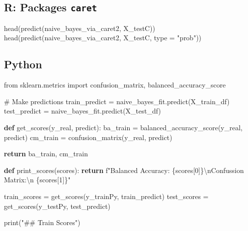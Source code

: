 \documentclass[
  letterpaper,
  DIV=11,
  numbers=noendperiod]{scrartcl}
\newenvironment{Shaded}{\begin{snugshade}}{\end{snugshade}}
\newcommand{\AttributeTok}[1]{\textcolor[rgb]{0.40,0.45,0.13}{#1}}
\newcommand{\BuiltInTok}[1]{\textcolor[rgb]{0.00,0.23,0.31}{#1}}
\newcommand{\CharTok}[1]{\textcolor[rgb]{0.13,0.47,0.30}{#1}}
\newcommand{\CommentTok}[1]{\textcolor[rgb]{0.37,0.37,0.37}{#1}}
\newcommand{\ControlFlowTok}[1]{\textcolor[rgb]{0.00,0.23,0.31}{\textbf{#1}}}
\newcommand{\DecValTok}[1]{\textcolor[rgb]{0.68,0.00,0.00}{#1}}
\newcommand{\FunctionTok}[1]{\textcolor[rgb]{0.28,0.35,0.67}{#1}}
\newcommand{\ImportTok}[1]{\textcolor[rgb]{0.00,0.46,0.62}{#1}}
\newcommand{\KeywordTok}[1]{\textcolor[rgb]{0.00,0.23,0.31}{\textbf{#1}}}
\newcommand{\NormalTok}[1]{\textcolor[rgb]{0.00,0.23,0.31}{#1}}
\newcommand{\OperatorTok}[1]{\textcolor[rgb]{0.37,0.37,0.37}{#1}}
\newcommand{\SpecialCharTok}[1]{\textcolor[rgb]{0.37,0.37,0.37}{#1}}
\newcommand{\SpecialStringTok}[1]{\textcolor[rgb]{0.13,0.47,0.30}{#1}}
\newcommand{\StringTok}[1]{\textcolor[rgb]{0.13,0.47,0.30}{#1}}
\begin{document}
\subsection{\texorpdfstring{R: Packages
\texttt{caret}}{R: Packages caret}}

\begin{Shaded}
\begin{Highlighting}[]
\FunctionTok{head}\NormalTok{(}\FunctionTok{predict}\NormalTok{(naive\_bayes\_via\_caret2, X\_testC))}
\FunctionTok{head}\NormalTok{(}\FunctionTok{predict}\NormalTok{(naive\_bayes\_via\_caret2, X\_testC, }\AttributeTok{type =} \StringTok{"prob"}\NormalTok{))}
\end{Highlighting}
\end{Shaded}

\subsection{Python}

\begin{Shaded}
\begin{Highlighting}[]
\ImportTok{from}\NormalTok{ sklearn.metrics }\ImportTok{import}\NormalTok{ confusion\_matrix, balanced\_accuracy\_score}

\CommentTok{\# Make predictions}
\NormalTok{train\_predict }\OperatorTok{=}\NormalTok{ naive\_bayes\_fit.predict(X\_train\_df)}
\NormalTok{test\_predict }\OperatorTok{=}\NormalTok{ naive\_bayes\_fit.predict(X\_test\_df)}

\KeywordTok{def}\NormalTok{ get\_scores(y\_real, predict):}
\NormalTok{  ba\_train }\OperatorTok{=}\NormalTok{ balanced\_accuracy\_score(y\_real, predict)}
\NormalTok{  cm\_train }\OperatorTok{=}\NormalTok{ confusion\_matrix(y\_real, predict)}

  \ControlFlowTok{return}\NormalTok{ ba\_train, cm\_train }

\KeywordTok{def}\NormalTok{ print\_scores(scores):}
  \ControlFlowTok{return} \SpecialStringTok{f"Balanced Accuracy: }\SpecialCharTok{\{}\NormalTok{scores[}\DecValTok{0}\NormalTok{]}\SpecialCharTok{\}}\CharTok{\textbackslash{}n}\SpecialStringTok{Confussion Matrix:}\CharTok{\textbackslash{}n}\SpecialStringTok{ }\SpecialCharTok{\{}\NormalTok{scores[}\DecValTok{1}\NormalTok{]}\SpecialCharTok{\}}\SpecialStringTok{"}

\NormalTok{train\_scores }\OperatorTok{=}\NormalTok{ get\_scores(y\_trainPy, train\_predict)}
\NormalTok{test\_scores }\OperatorTok{=}\NormalTok{ get\_scores(y\_testPy, test\_predict)}


\BuiltInTok{print}\NormalTok{(}\StringTok{"\#\# Train Scores"}\NormalTok{)}
\end{Highlighting}
\end{Shaded}
\end{document}
